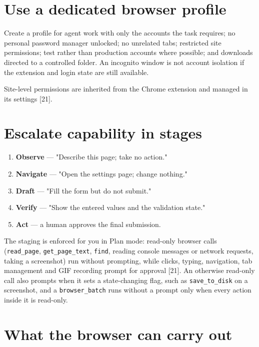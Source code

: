 \documentclass[11pt,a4paper,twoside,openany]{book}
\begin{document}
\FloatBarrier
\setcounter{section}{1}
\section{Use a dedicated browser profile}

Create a profile for agent work with only the accounts the task requires; no personal password manager unlocked; no unrelated tabs; restricted site permissions; test rather than production accounts where possible; and downloads directed to a controlled folder. An incognito window is not account isolation if the extension and login state are still available.


Site-level permissions are inherited from the Chrome extension and managed in its settings [21].


\FloatBarrier
\setcounter{section}{2}
\section{Escalate capability in stages}

\begin{enumerate}
\item \textbf{Observe} — "Describe this page; take no action."
\item \textbf{Navigate} — "Open the settings page; change nothing."
\item \textbf{Draft} — "Fill the form but do not submit."
\item \textbf{Verify} — "Show the entered values and the validation state."
\item \textbf{Act} — a human approves the final submission.
\end{enumerate}

The staging is enforced for you in Plan mode: read-only browser calls (\texttt{read\_\allowbreak{}page}, \texttt{get\_\allowbreak{}page\_\allowbreak{}text}, \texttt{find}, reading console messages or network requests, taking a screenshot) run without prompting, while clicks, typing, navigation, tab management and GIF recording prompt for approval [21]. An otherwise read-only call also prompts when it sets a state-changing flag, such as \texttt{save\_\allowbreak{}to\_\allowbreak{}disk} on a screenshot, and a \texttt{browser\_\allowbreak{}batch} runs without a prompt only when every action inside it is read-only.


\FloatBarrier
\setcounter{section}{3}
\section{What the browser can carry out}
\end{document}
